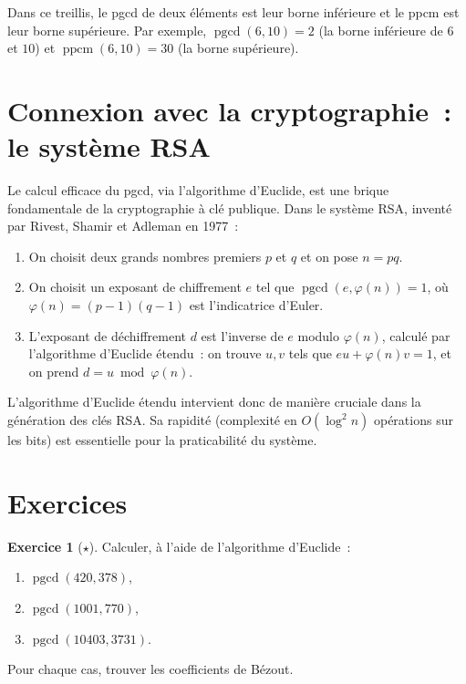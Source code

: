 \documentclass[12pt,a4paper,openany]{book}
\theoremstyle{definition}
\newtheorem{exercice}{Exercice}[chapter]
\theoremstyle{plain}
\theoremstyle{remark}
\DeclareMathOperator{\pgcd}{pgcd}
\DeclareMathOperator{\ppcm}{ppcm}
\begin{document}

Dans ce treillis, le pgcd de deux éléments est leur borne inférieure et le ppcm est
leur borne supérieure. Par exemple, $\pgcd(6, 10) = 2$ (la borne inférieure de $6$
et $10$) et $\ppcm(6, 10) = 30$ (la borne supérieure).

\section{Connexion avec la cryptographie~: le système RSA}
\label{sec:ch1:rsa}


Le calcul efficace du pgcd, via l'algorithme d'Euclide, est une brique fondamentale
de la cryptographie à clé publique. Dans le système
RSA, inventé par Rivest, Shamir et Adleman%
 en 1977~:

\begin{enumerate}[label=\arabic*.]
  \item On choisit deux grands nombres premiers $p$ et $q$ et on pose $n = pq$.
  \item On choisit un exposant de chiffrement $e$ tel que
    $\pgcd(e, \varphi(n)) = 1$, où $\varphi(n) = (p-1)(q-1)$ est l'indicatrice
    d'Euler.
  \item L'exposant de déchiffrement $d$ est l'inverse de $e$ modulo $\varphi(n)$,
    calculé par l'algorithme d'Euclide étendu~: on trouve $u, v$ tels que
    $eu + \varphi(n)v = 1$, et on prend $d = u \bmod \varphi(n)$.
\end{enumerate}

L'algorithme d'Euclide étendu intervient donc de manière cruciale dans la génération
des clés RSA. Sa rapidité (complexité en $O(\log^2 n)$ opérations sur les bits) est
essentielle pour la praticabilité du système.

\section{Exercices}
\label{sec:ch1:exercices}

\begin{exercice}[$\star$]
\label{exo:ch1:pgcd_calculs}
Calculer, à l'aide de l'algorithme d'Euclide~:
\begin{enumerate}[label=(\alph*)]
  \item $\pgcd(420, 378)$,
  \item $\pgcd(1001, 770)$,
  \item $\pgcd(10403, 3731)$.
\end{enumerate}
Pour chaque cas, trouver les coefficients de Bézout.
\end{exercice}
\end{document}
